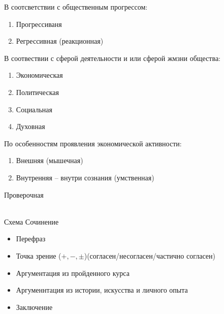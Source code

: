 \documentclass[12pt,a4paper]{book}
\begin{document}
В соотсветствии с общественным прогрессом:
\begin{enumerate}
	\item Прогрессиваня
	\item Регрессивная (реакционная)
\end{enumerate}

В соотвествии с сферой деятельности и или сферой жмзни общества:
\begin{enumerate}
	\item Экономическая
	\item Политическая
	\item Социальная
	\item Духовная
\end{enumerate}

По особенностям проявления экономической активности:
\begin{enumerate}
	\item Внешняя (мышечная)
	\item Внутренняя -- внутри сознания (умственная)
\end{enumerate}

\begin{Huge}
Проверочная	
\end{Huge}\\
Схема Сочинение
\begin{itemize}
	\item Перефраз
	\item Точка зрение ($+, -, \pm$)(согласен/несогласен/частично согласен)
	\item Аргументация из пройденного курса
	\item Аргуменнтация из истории, искусства и личного опыта
	\item Заключение
\end{itemize}
\end{document}
